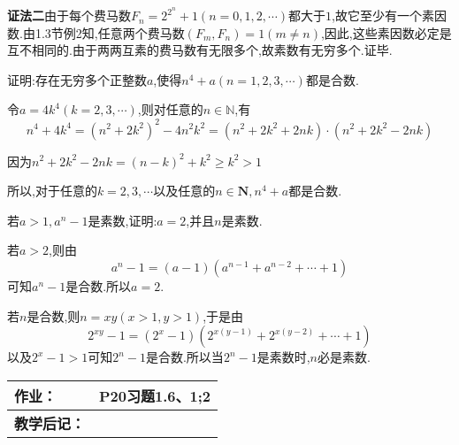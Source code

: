 \textbf{证法二}由于每个费马数$F_{n}=2^{2^{n}}+1(n=0,1,2, \cdots)$都大于$1$,故它至少有一个素因数.由1.3节例2知,任意两个费马数$\left(F_{m}, F_{n}\right)=1(m \neq n)$,因此,这些素因数必定是互不相同的.由于两两互素的费马数有无限多个,故素数有无穷多个.证毕.

\example 证明:存在无穷多个正整数$a$,使得$n^{4}+a(n=1,2,3, \cdots)$都是合数.

\proof 令$a=4 k^{4}(k=2,3, \cdots)$,则对任意的$n \in \mathbb{N}$,有
\begin{equation*}
	n^{4}+4 k^{4}=\left(n^{2}+2 k^{2}\right)^{2}-4 n^{2} k^{2}=\left(n^{2}+2 k^{2}+2 n k\right) \cdot\left(n^{2}+2 k^{2}-2 n k\right)
\end{equation*}

因为$n^{2}+2 k^{2}-2 n k=(n-k)^{2}+k^{2} \geqslant k^{2}>1$

所以,对于任意的$k=2,3, \cdots$以及任意的$n \in \mathbf{N}, n^{4}+a$都是合数.

\example 若$a>1, a^{n}-1$是素数,证明:$a=2$,并且$n$是素数.

\proof 若$a>2$,则由
\begin{equation*}
	a^{n}-1=(a-1)\left(a^{n-1}+a^{n-2}+\cdots+1\right)
\end{equation*}
可知$a^{n}-1$是合数.所以$a=2$.

若$n$是合数,则$n=x y(x>1, y>1)$,于是由
\begin{equation*}
	2^{x y}-1=\left(2^{x}-1\right)\left(2^{x(y-1)}+2^{x(y-2)}+\cdots+1\right)
\end{equation*}
以及$2^{x}-1>1$可知$2^{n}-1$是合数.所以当$2^{n}-1$是素数时,$n$必是素数.

\begin{table}[htb]
	\centering  
	\begin{tabular}{p{22mm}|p{105.6mm}}
		\hline 
		\textbf{作业：}      & P20习题1.6、1;2  \\ \hline
		\textbf{教学后记：}  & \vspace{4ex} \\ \hline
	\end{tabular}
\end{table}


